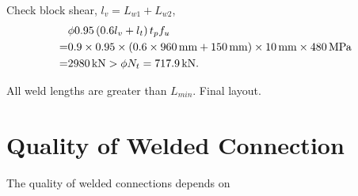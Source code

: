\begin{solution}
\begin{enumerate}
Check block shear, $l_v=L_{w1}+L_{w2}$,
\begin{align*}
&\phi0.95\left(0.6l_{v}+l_{t}\right)t_pf_u\\
=&0.9\times0.95\times\left(0.6\times\SI{960}{\milli\meter}+\SI{150}{\milli\meter}\right)\times\SI{10}{\milli\meter}\times\SI{480}{\mega\pascal}\\
=&\SI{2980}{\kilo\newton}>\phi{}N_t=\SI{717.9}{\kilo\newton}.
\end{align*}

All weld lengths are greater than $L_{min}$. Final layout.
\begin{figure}[H]
\centering

\end{figure}
\end{enumerate}
\end{solution}
\section{Quality of Welded Connection}
The quality of welded connections depends on
